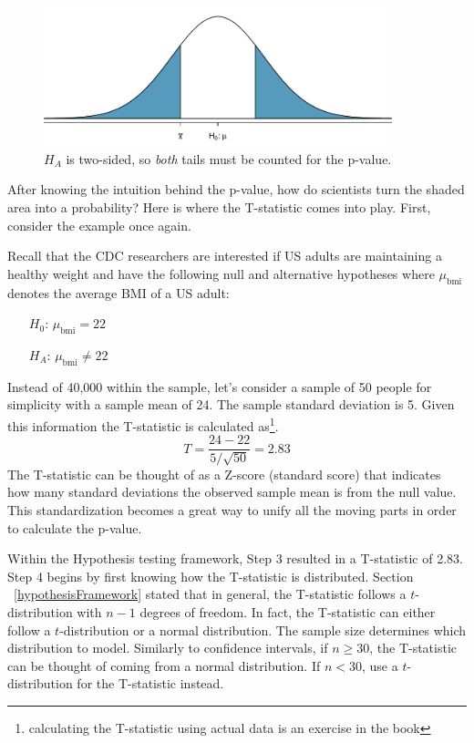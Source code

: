 \begin{figure}
   \centering
   \includegraphics[width=0.9\textwidth]{ch_inference_foundations_oi_biostat/figures/2ndSchSleepHTExample/2ndSchSleepHTExample}
   \caption{$H_A$ is two-sided, so \emph{both} tails must be counted for the p-value.}
   \label{2ndSchSleepHTExample}
\end{figure}

After knowing the intuition behind the p-value, how do scientists turn the shaded area into a probability? Here is where the T-statistic comes into play. First, consider the  example once again.

Recall that the CDC researchers are interested if US adults are maintaining a healthy weight and have the following null and alternative hypotheses where $\mu_{\mathrm{bmi}}$ denotes the average BMI of a US adult:

 \begin{itemize}
\setlength{\itemsep}{0mm}
\item[$H_0$:] $\mu_{\mathrm{bmi}}=22$
\item[$H_A$:] $\mu_{\mathrm{bmi}} \neq 22$ 
\end{itemize}

Instead of 40,000 within the  sample, let's consider a sample of 50 people for simplicity with a sample mean of 24. The sample standard deviation is 5. Given this information the T-statistic is calculated as\footnote{calculating the T-statistic using actual data is an exercise in the book}. \[T=\frac{24-22}{5/\sqrt{50}}= 2.83\] The T-statistic can be thought of as a Z-score (standard score) that indicates how many standard deviations the observed sample mean is from the null value. This standardization becomes a great way to unify all the moving parts in order to calculate the p-value. 

Within the Hypothesis testing framework, Step 3 resulted in a T-statistic of 2.83. Step 4 begins by first knowing how the T-statistic is distributed. Section ~\ref{hypothesisFramework} stated that in general, the T-statistic follows a $t$-distribution with $n-1$ degrees of freedom. In fact, the T-statistic can either follow a $t$-distribution or a normal distribution. The sample size determines which distribution to model. Similarly to confidence intervals, if $n \geq 30$, the T-statistic can be thought of coming from a normal distribution. If $n < 30$, use a $t$-distribution for the T-statistic instead.

